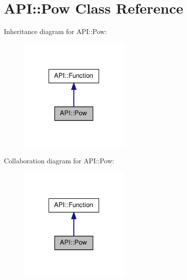 \hypertarget{class_a_p_i_1_1_pow}{\section{A\-P\-I\-:\-:Pow Class Reference}
\label{class_a_p_i_1_1_pow}
}


Inheritance diagram for A\-P\-I\-:\-:Pow\-:\nopagebreak
\begin{figure}[H]
\begin{center}
\leavevmode
\includegraphics[width=156pt]{class_a_p_i_1_1_pow__inherit__graph}
\end{center}
\end{figure}


Collaboration diagram for A\-P\-I\-:\-:Pow\-:\nopagebreak
\begin{figure}[H]
\begin{center}
\leavevmode
\includegraphics[width=156pt]{class_a_p_i_1_1_pow__coll__graph}
\end{center}
\end{figure}
